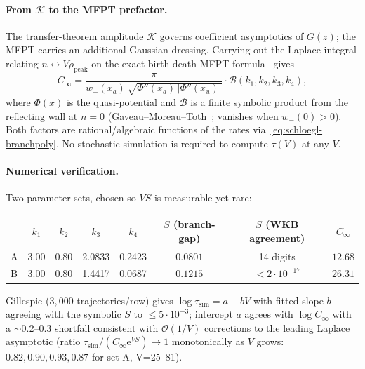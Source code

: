\documentclass[11pt,a4paper]{article}
\newcommand{\ee}{\mathrm{e}}
\theoremstyle{plain}
\begin{document}
\paragraph{From $\mathcal K$ to the MFPT prefactor.}
The transfer-theorem amplitude $\mathcal K$ governs coefficient
asymptotics of $G(z)$; the MFPT carries an additional Gaussian
dressing.  Carrying out the Laplace integral relating
$n \leftrightarrow V\rho_{\mathrm{peak}}$ on the exact birth-death
MFPT formula~\citep{Gardiner2009} gives
\begin{equation}\label{eq:schloegl-C-kramers}
  C_\infty =
  \frac{\pi}{w_+(x_a)\,\sqrt{\Phi''(x_a)\,|\Phi''(x_u)|}}
  \cdot \mathcal B(k_1,k_2,k_3,k_4),
\end{equation}
where $\Phi(x)$ is the quasi-potential and $\mathcal B$ is a
finite symbolic product from the reflecting wall at $n = 0$
(Gaveau--Moreau--Toth~\citep{GaveauMoreauToth1996}; vanishes when
$w_-(0) > 0$).  Both factors are rational/algebraic functions of
the rates via~\eqref{eq:schloegl-branchpoly}.  No stochastic
simulation is required to compute $\tau(V)$ at any $V$.

\paragraph{Numerical verification.}
Two parameter sets, chosen so $VS$ is measurable yet rare:
\begin{center}\small
\begin{tabular}{@{}lccccccc@{}}\toprule
 & $k_1$ & $k_2$ & $k_3$ & $k_4$
 & $S$ (branch-gap) & $S$ (WKB agreement) & $C_\infty$ \\ \midrule
A & 3.00 & 0.80 & 2.0833 & 0.2423 & $0.0801$ & 14 digits & $12.68$ \\
B & 3.00 & 0.80 & 1.4417 & 0.0687 & $0.1215$ & $< 2\cdot 10^{-17}$ & $26.31$ \\
\bottomrule\end{tabular}
\end{center}
Gillespie ($3{,}000$ trajectories/row) gives
$\log \tau_{\mathrm{sim}} = a + bV$ with fitted slope $b$ agreeing
with the symbolic $S$ to $\leq 5\cdot 10^{-3}$; intercept $a$
agrees with $\log C_\infty$ with a
$\sim 0.2$--$0.3$ shortfall consistent with $\mathcal O(1/V)$
corrections to the leading Laplace asymptotic (ratio
$\tau_{\mathrm{sim}}/(C_\infty \ee^{VS}) \to 1$ monotonically as
$V$ grows: $0.82, 0.90, 0.93, 0.87$ for set A, V=25--81).
\end{document}
